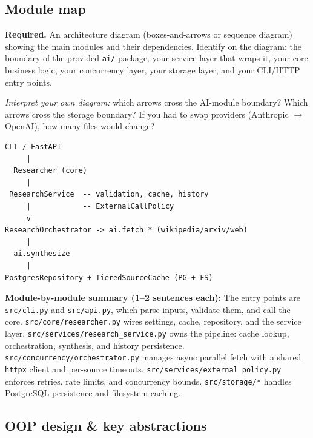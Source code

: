 \documentclass[11pt,a4paper]{article}
\begin{document}
\subsection{Module map}

\begin{deliverbox}
\textbf{Required.} An architecture diagram (boxes-and-arrows or sequence diagram) showing the main modules and their dependencies. Identify on the diagram: the boundary of the provided \texttt{ai/} package, your service layer that wraps it, your core business logic, your concurrency layer, your storage layer, and your CLI/HTTP entry points.
\end{deliverbox}

\begin{probebox}
\textit{Interpret your own diagram:} which arrows cross the AI-module boundary? Which arrows cross the storage boundary? If you had to swap providers (Anthropic $\to$ OpenAI), how many files would change?
\end{probebox}

\begin{center}
\begin{verbatim}
CLI / FastAPI
     |
  Researcher (core)
     |
 ResearchService  -- validation, cache, history
     |            -- ExternalCallPolicy
     v
ResearchOrchestrator -> ai.fetch_* (wikipedia/arxiv/web)
     |
  ai.synthesize
     |
PostgresRepository + TieredSourceCache (PG + FS)
\end{verbatim}
\end{center}

\textbf{Module-by-module summary (1--2 sentences each):} The entry points are \texttt{src/cli.py} and \texttt{src/api.py}, which parse inputs, validate them, and call the core. \texttt{src/core/researcher.py} wires settings, cache, repository, and the service layer. \texttt{src/services/research\_service.py} owns the pipeline: cache lookup, orchestration, synthesis, and history persistence. \texttt{src/concurrency/orchestrator.py} manages async parallel fetch with a shared \texttt{httpx} client and per-source timeouts. \texttt{src/services/external\_policy.py} enforces retries, rate limits, and concurrency bounds. \texttt{src/storage/*} handles PostgreSQL persistence and filesystem caching.

\subsection{OOP design \& key abstractions}
\end{document}
